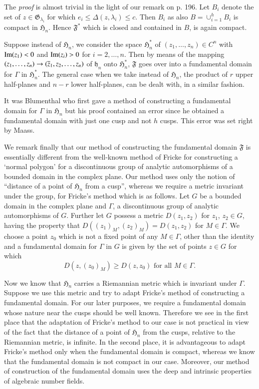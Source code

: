 The {\em proof} is almost trivial in the light of our remark on p.\@
196. Let $B_{i}$ denote the set of $z\in\mathfrak{G}_{\lambda_{i}}$
for which $e_{i}\leq \Delta(z,\lambda_{i})\leq c$. Then $B_{i}$ as
also $B=\cup^{h}_{i=1}B_{i}$ is compact in $\mathfrak{H}_{n}$. Hence
$\mathfrak{F}^{\ast}$ which is closed and contained in $B$, is again
compact.

Suppose instead of $\mathfrak{H}_{n}$, we consider the space
$\mathfrak{H}^{\ast}_{n}$ of $(z_{1},\ldots,z_{n})\in C^{n}$ with
$\operatorname{Im}(z_{1})<0$ and $\operatorname{Im}(z_{i})>0$ for $i=2,\ldots,n$. Then by means
of the mapping $(z_{1},\ldots,z_{n})\to
(\overline{z}_{1},z_{2},\ldots,z_{n})$ of $\mathfrak{h}_{n}$ onto
$\mathfrak{H}^{\ast}_{n}$, $\mathfrak{F}$ goes over into a fundamental
domain for $\Gamma$ in $\mathfrak{H}^{\ast}_{n}$. The general case
when we take instead of $\mathfrak{H}_{n}$, the product of $r$ upper
half-planes and $n-r$ lower half-planes, can be dealt with, in a
similar fashion.

It was Blumenthal who first gave a method of constructing a
fundamental domain for $\Gamma$ in $\mathfrak{H}_{n}$ but his proof
contained an error since he obtained a fundamental domain with just
one cusp and not $h$ cusps. This error was set right by Maass.

We remark finally that our method of constructing the fundamental
domain $\mathfrak{F}$ is essentially different from the well-known
method of Fricke for constructing a `normal polygon' for a
discontinuous group of analytic automorphisms of a bounded domain in
the complex plane. Our method uses only the notion of ``distance of a
point of $\mathfrak{H}_{n}$ from a cusp'', whereas we require a metric
invariant under the group, for Fricke's method which is as
follows. Let $G$ be a bounded domain in the complex plane and
$\Gamma$, a discontinuous group of analytic automorphisms of
$G$. Further let $G$ possess a metric $D(z_{1},z_{2})$ for $z_{1}$,
$z_{2}\in G$, having the property that
$D((z_{1})_{M},(z_{2})_{M})=D(z_{1},z_{2})$ for $M\in \Gamma$. We
choose a point $z_{0}$ which is not a fixed point of any $M\in\Gamma$,
other than the identity and a fundamental domain for $\Gamma$ in $G$
is given by the set of points $z\in G$ for which 
$$
D(z,(z_{0})_{M})\geq D(z,z_{0})\text{ \ for all \ } M\in \Gamma.
$$\pageoriginale

Now we know that $\mathfrak{H}_{n}$ carries a Riemannian metric which
is invariant under $\Gamma$. Suppose we use this metric and try to
adapt Fricke's method of constructing a fundamental domain. For our
later purposes, we require a fundamental domain whose nature near the
cusps should be well known. Therefore we see in the first place that
the adaptation of Fricke's method to our case is not practical in view
of the fact that the distance of a point of $\mathfrak{H}_{n}$ from
the cusps, relative to the Riemannian metric, is infinite. In the
second place, it is advantageous to adapt Fricke's method only when
the fundamental domain is compact, whereas we know that the
fundamental domain is not compact in our case. Moreover, our method of
construction of the fundamental domain uses the deep and intrinsic
properties of algebraic number fields.

